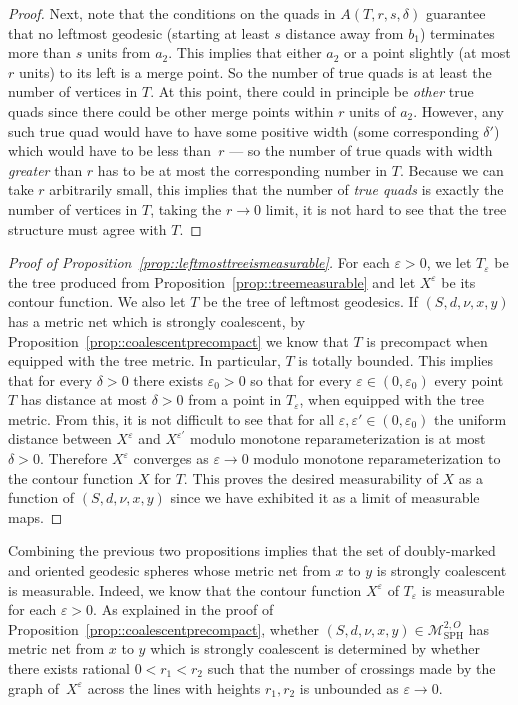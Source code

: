 \documentclass[JEP,XML,SOM,Unicode]{cedram}
\let\mathcal\mathscr
\let\epsilon\varepsilon
\theoremstyle{plain}
\numberwithin{theorem}{section}
\theoremstyle{definition}
\newcommand\gmsspace{{\mathcal M}_{\mathrm{SPH}}}
\begin{document}
\begin{proof}
Next, note that the conditions on the quads in $A(T,r,s,\delta)$ guarantee that no leftmost geodesic (starting at least $s$ distance away from $b_1$) terminates more than $s$ units from $a_2$. This implies that either $a_2$ or a point slightly (at most $r$ units) to its left is a merge point. So the number of true quads is at least the number of vertices in $T$. At this point, there could in principle be \emph{other} true quads since there could be other merge points within $r$ units of $a_2$. However, any such true quad would have to have some positive width (some corresponding $\delta'$) which would have to be less than~$r$ --- so the number of true quads with width \emph{greater} than $r$ has to be at most the corresponding number in $T$. Because we can take $r$ arbitrarily small, this implies that the number of \emph{true quads} is exactly the number of vertices in $T$, taking the $r \to 0$ limit, it is not hard to see that the tree structure must agree with $T$.
\end{proof}

\begin{proof}[Proof of Proposition~\ref{prop::leftmosttreeismeasurable}]
For each $\epsilon > 0$, we let $T_\epsilon$ be the tree produced from Proposition~\ref{prop::treemeasurable} and let $X^\epsilon$ be its contour function. We also let $T$ be the tree of leftmost geodesics. If $(S,d,\nu,x,y)$ has a metric net which is strongly coalescent, by Proposition~\ref{prop::coalescentprecompact} we know that $T$ is precompact when equipped with the tree metric. In particular, $T$ is totally bounded. This implies that for every $\delta > 0$ there exists $\epsilon_0 > 0$ so that for every $\epsilon \in (0,\epsilon_0)$ every point $T$ has distance at most $\delta > 0$ from a point in $T_\epsilon$, when equipped with the tree metric. From this, it is not difficult to see that for all $\epsilon,\epsilon' \in (0,\epsilon_0)$ the uniform distance between $X^\epsilon$ and $X^{\epsilon'}$ modulo monotone reparameterization is at most $\delta > 0$. Therefore $X^\epsilon$ converges as $\epsilon \to 0$ modulo monotone reparameterization to the contour function $X$ for $T$. This proves the desired measurability of $X$ as a function of $(S,d,\nu,x,y)$ since we have exhibited it as a limit of measurable maps.
\end{proof}

Combining the previous two propositions implies that the set of doubly-marked and oriented geodesic spheres whose metric net from $x$ to $y$ is strongly coalescent is measurable. Indeed, we know that the contour function $X^\epsilon$ of $T_\epsilon$ is measurable for each $\epsilon > 0$. As explained in the proof of Proposition~\ref{prop::coalescentprecompact}, whether $(S,d,\nu,x,y) \in \gmsspace^{2,O}$ has metric net from $x$ to $y$ which is strongly coalescent is determined by whether there exists rational $0 < r_1 < r_2$ such that the number of crossings made by the graph of~$X^\epsilon$ across the lines with heights $r_1,r_2$ is unbounded as $\epsilon \to 0$.
\end{document}
